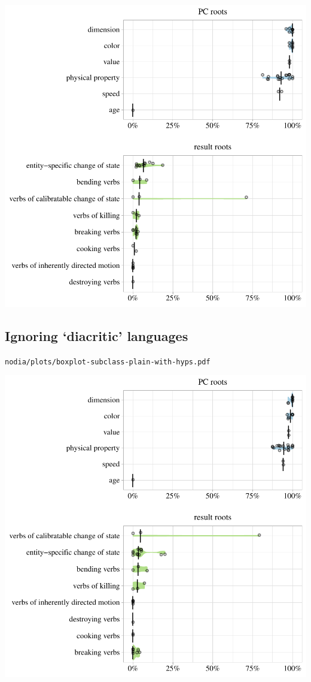 \includegraphics[width=1.0\textwidth]{../nolow/plots/boxplot-subclass-plain-with-hyps.pdf}

\subsection{Ignoring `diacritic' languages}

\texttt{nodia/plots/boxplot-subclass-plain-with-hyps.pdf}

\includegraphics[width=1.0\textwidth]{../nodia/plots/boxplot-subclass-plain-with-hyps.pdf}


